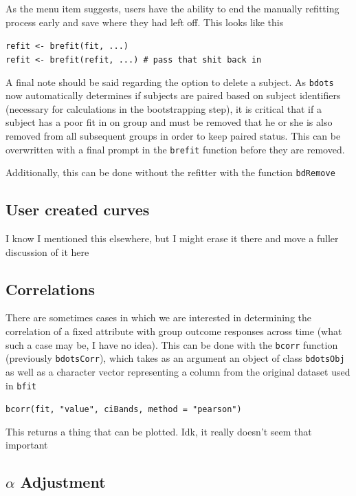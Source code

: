 \documentclass{article}
\begin{document}
As the menu item suggests, users have the ability to end the manually refitting process early and save where they had left off. This looks like this

\begin{center}
\texttt{refit <- brefit(fit, ...)} \\
\texttt{refit <- brefit(refit, ...) \# pass that shit back in}
\end{center}

A final note should be said regarding the option to delete a subject. As \texttt{bdots} now automatically determines if subjects are paired based on subject identifiers (necessary for  calculations in the bootstrapping step), it is critical that if a subject has a poor fit in on group and must be removed that he or she is also removed from all subsequent groups in order to keep paired status. This can be overwritten with a final prompt in the \texttt{brefit} function before they are removed.

Additionally, this can be done without the refitter with the function \texttt{bdRemove}


\subsection{User created curves}

I know I mentioned this elsewhere, but I might erase it there and move a fuller discussion of it here

\subsection{Correlations}

There are sometimes cases in which we are interested in determining the correlation of a fixed attribute with group outcome responses across time (what such a case may be, I have no idea). This can be done with the \texttt{bcorr} function (previously \texttt{bdotsCorr}), which takes as an argument an object of class \texttt{bdotsObj} as well as a character vector representing a column from the original dataset used in \texttt{bfit}

\begin{center}
\texttt{bcorr(fit, "value", ciBands, method = "pearson")} 
\end{center}

This returns a thing that can be plotted. Idk, it really doesn't seem that important

\subsection{$\alpha$ Adjustment}
\end{document}
